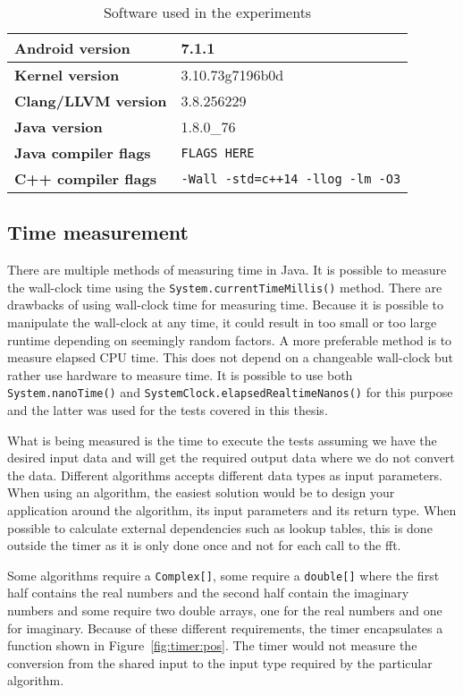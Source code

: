 \ifrelease
\begin{table}[H]
    \centering
    \caption{Software used in the experiments}
    \begin{tabular}{|l|l|}
        \hline
        \textbf{Android version} & 7.1.1\\
        \hline
        \textbf{Kernel version} & 3.10.73g7196b0d\\
        \hline
        \textbf{Clang/LLVM version} & 3.8.256229\\
        \hline
        \textbf{Java version} & 1.8.0\_76\\
        \hline
        \textbf{Java compiler flags} & \texttt{FLAGS HERE}\\
        \hline
        \textbf{C++ compiler flags} & \texttt{-Wall -std=c++14 -llog -lm -O3}\\
        \hline
    \end{tabular}
    \label{tab:software}
\end{table}
\fi

\subsection{Time measurement}
There are multiple methods of measuring time in Java. It is possible to measure the wall-clock time using the \texttt{System.currentTimeMillis()} method. There are drawbacks of using wall-clock time for measuring time. Because it is possible to manipulate the wall-clock at any time, it could result in too small or too large runtime depending on seemingly random factors. A more preferable method is to measure elapsed CPU time. This does not depend on a changeable wall-clock but rather use hardware to measure time. It is possible to use both \texttt{System.nanoTime()} and \texttt{SystemClock.elapsedRealtimeNanos()} for this purpose and the latter was used for the tests covered in this thesis.

What is being measured is the time to execute the tests assuming we have the desired input data and will get the required output data where we do not convert the data. Different algorithms accepts different data types as input parameters. When using an algorithm, the easiest solution would be to design your application around the algorithm, its input parameters and its return type. When possible to calculate external dependencies such as lookup tables, this is done outside the timer as it is only done once and not for each call to the \gls{fft}.

Some algorithms require a \texttt{Complex[]}, some require a \texttt{double[]} where the first half contains the real numbers and the second half contain the imaginary numbers and some require two double arrays, one for the real numbers and one for imaginary. Because of these different requirements, the timer encapsulates a function shown in Figure~\ref{fig:timer:pos}. The timer would not measure the conversion from the shared input to the input type required by the particular algorithm.

